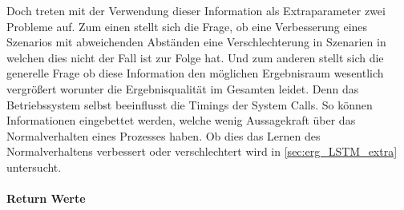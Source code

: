                     Doch treten mit der Verwendung dieser Information als Extraparameter zwei Probleme auf.
                    Zum einen stellt sich die Frage, ob eine Verbesserung eines Szenarios mit abweichenden Abständen eine Verschlechterung in Szenarien in welchen dies nicht der Fall ist zur Folge hat.
                    Und zum anderen stellt sich die generelle Frage ob diese Information den möglichen Ergebnisraum wesentlich vergrößert worunter die Ergebnisqualität im Gesamten leidet.
                    Denn das Betriebssystem selbst beeinflusst die Timings der System Calls.
                    So können Informationen eingebettet werden, welche wenig Aussagekraft über das Normalverhalten eines Prozesses haben.
                    Ob dies das Lernen des Normalverhaltens verbessert oder verschlechtert wird in \autoref{sec:erg_LSTM_extra} untersucht.

                \paragraph{Return Werte}

